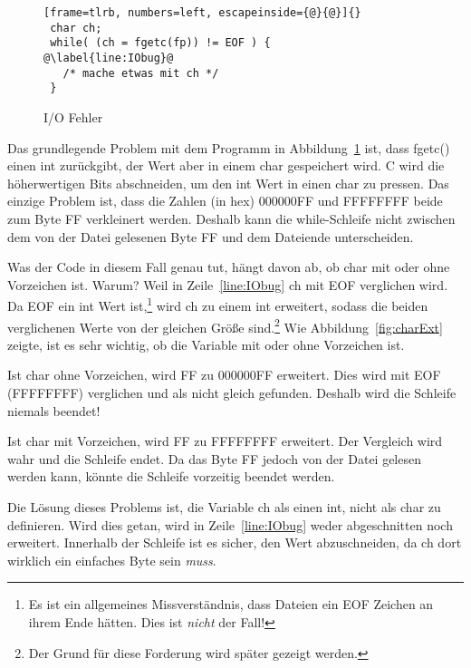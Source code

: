 \begin{figure}[ht]
\begin{lstlisting}[frame=tlrb, numbers=left, escapeinside={@}{@}]{}
 char ch;
 while( (ch = fgetc(fp)) != EOF ) {             @\label{line:IObug}@
   /* mache etwas mit ch */
 }
\end{lstlisting}
\caption{I/O Fehler}
\label{fig:IObug}
\end{figure}

Das grundlegende Problem mit dem Programm in
Abbildung~\ref{fig:IObug} ist, dass {\code fgetc()} einen {\code
int} zur\"{u}ckgibt, der Wert aber in einem {\code char} gespeichert
wird. C wird die h\"{o}herwertigen Bits abschneiden, um den {\code int}
Wert in einen {\code char} zu pressen. Das einzige Problem ist, dass
die Zahlen (in hex) {\code 000000FF} und {\code FFFFFFFF} beide zum
Byte {\code FF} verkleinert werden. Deshalb kann die while-Schleife
nicht zwischen dem von der Datei gelesenen Byte {\code FF} und dem
Dateiende unterscheiden.

Was der Code in diesem Fall genau tut, h\"{a}ngt davon ab, ob {\code
char} mit oder ohne Vorzeichen ist. Warum? Weil in
Zeile~\ref{line:IObug} {\code ch} mit {\code EOF} verglichen wird.
Da {\code EOF} ein {\code int} Wert ist,\footnote{Es ist ein
allgemeines Missverst\"{a}ndnis, dass Dateien ein EOF Zeichen an ihrem
Ende h\"{a}tten. Dies ist \emph{nicht} der Fall!} wird {\code ch} zu
einem {\code int} erweitert, sodass die beiden verglichenen Werte
von der gleichen Gr\"{o}{\ss}e sind.\footnote{Der Grund f\"{u}r diese Forderung
wird sp\"{a}ter gezeigt werden.} Wie Abbildung~\ref{fig:charExt} zeigte,
ist es sehr wichtig, ob die Variable mit oder ohne Vorzeichen ist.

Ist {\code char} ohne Vorzeichen, wird {\code FF} zu {\code
000000FF} erweitert. Dies wird mit {\code EOF} ({\code FFFFFFFF})
verglichen und als nicht gleich gefunden. Deshalb wird die Schleife
niemals beendet!

Ist {\code char} mit Vorzeichen, wird {\code FF} zu {\code FFFFFFFF}
erweitert. Der Vergleich wird wahr und die Schleife endet. Da das
Byte {\code FF} jedoch von der Datei gelesen werden kann, k\"{o}nnte die
Schleife vorzeitig beendet werden.

Die L\"{o}sung dieses Problems ist, die Variable {\code ch} als einen
{\code int}, nicht als {\code char} zu definieren. Wird dies getan,
wird in Zeile~\ref{line:IObug} weder abgeschnitten noch erweitert.
Innerhalb der Schleife ist es sicher, den Wert abzuschneiden, da
{\code ch} dort wirklich ein einfaches Byte sein \emph{muss}.

